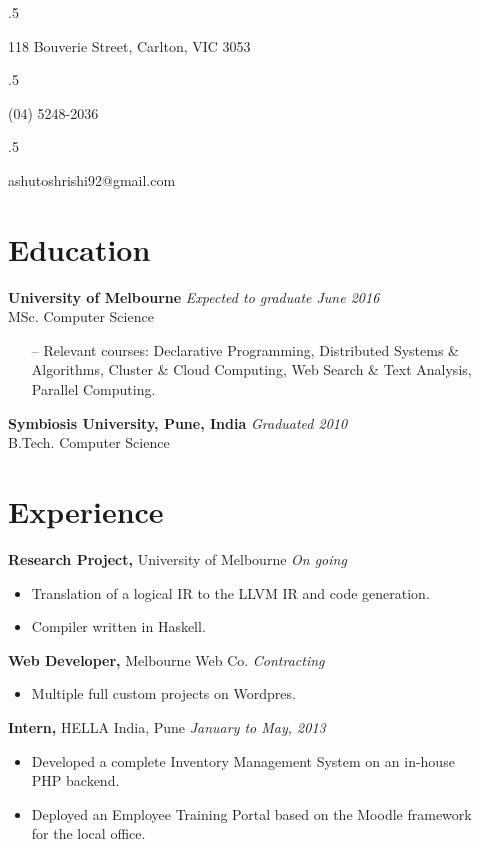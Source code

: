\documentclass[margin]{res}
\begin{document}

\begin{resume}
  \moveleft.5\hoffset\centerline{118 Bouverie Street, Carlton, VIC 3053}
  \moveleft.5\hoffset\centerline{(04) 5248-2036}
  \moveleft.5\hoffset\centerline{ashutoshrishi92@gmail.com}
  
  \section{Education}  
  \textbf{University of Melbourne} \hfill \textit{Expected to graduate June 2016} \\
  MSc. Computer Science 
  \begin{itemize} \itemsep -2pt
  \item[--] Relevant courses: Declarative Programming, Distributed Systems \& Algorithms,
    Cluster \& Cloud Computing, Web Search \& Text Analysis, Parallel Computing.
  \end{itemize}

  \textbf{Symbiosis University, Pune, India} \hfill \textit{Graduated 2010} \\
  B.Tech. Computer Science 

  \section{Experience}
  \textbf{Research Project,} University of Melbourne \hfill \textit{On going}
  \begin{itemize} \itemsep -2pt
  \item Translation of a logical IR to the LLVM IR and code generation.
  \item Compiler written in Haskell.
  \end{itemize}

  \textbf{Web Developer,} Melbourne Web Co. \hfill \textit{Contracting}
  \begin{itemize} \itemsep -2pt
  \item Multiple full custom projects on Wordpres. 
  \end{itemize}

  \textbf{Intern,} HELLA India, Pune \hfill \textit{January to May, 2013}
  \begin{itemize} \itemsep -2pt
  \item Developed a complete Inventory Management System on an in-house \\ 
    PHP backend.
  \item Deployed an Employee Training Portal based on the Moodle framework \\ 
    for the local office.
  \end{itemize}
  

\end{resume}
\end{document}
